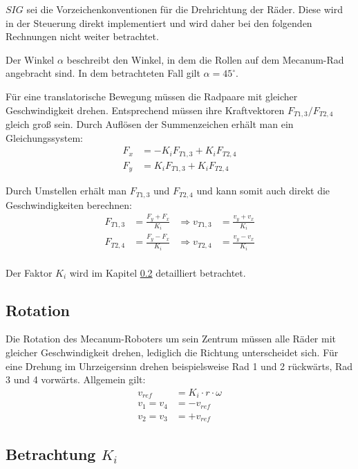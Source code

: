 $SIG$ sei die Vorzeichenkonventionen für die Drehrichtung der Räder.
Diese wird in der Steuerung direkt implementiert und wird daher bei den folgenden Rechnungen nicht weiter betrachtet.

Der Winkel $\alpha$ beschreibt den Winkel, in dem die Rollen auf dem Mecanum-Rad angebracht sind.
In dem betrachteten Fall gilt $\alpha = 45^\circ$.

Für eine translatorische Bewegung müssen die Radpaare mit gleicher Geschwindigkeit drehen.
Entsprechend müssen ihre Kraftvektoren $F_{T1, 3} / F_{T2, 4}$ gleich groß sein.
Durch Auflösen der Summenzeichen erhält man ein Gleichungssystem:
\begin{align*}
    F_x &= - K_i F_{T1, 3} + K_i F_{T2, 4} \\
    F_y &= K_i F_{T1, 3}   + K_i F_{T2, 4}
\end{align*}

Durch Umstellen erhält man $F_{T1, 3}$ und $F_{T2, 4}$ und kann somit auch direkt die Geschwindigkeiten berechnen:
\begin{align*}
    F_{T1, 3} &= \frac{F_y + F_x}{K_i} &\Rightarrow v_{T1, 3} &= \frac{v_y + v_x}{K_i} \\
    F_{T2, 4} &= \frac{F_y - F_x}{K_i} &\Rightarrow v_{T2, 4} &= \frac{v_y - v_x}{K_i} \\
\end{align*}

Der Faktor $K_i$ wird im Kapitel \ref{sec:k-faktor} detailliert betrachtet.


\subsection{Rotation}
\label{sec:Rotation}
Die Rotation des Mecanum-Roboters um sein Zentrum müssen alle Räder mit gleicher Geschwindigkeit drehen, lediglich die Richtung unterscheidet sich.
Für eine Drehung im Uhrzeigersinn drehen beispielsweise Rad 1 und 2 rückwärts, Rad 3 und 4 vorwärts. Allgemein gilt:
\begin{align*}
    v_{ref} &= K_i \cdot r \cdot \omega \\
    v_1 = v_4 &= - v_{ref} \\
    v_2 = v_3 &= + v_{ref}
\end{align*}

\subsection{Betrachtung $K_i$}
\label{sec:k-faktor}

